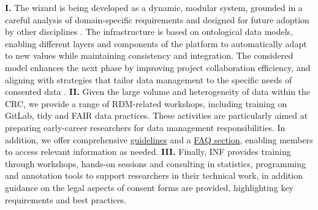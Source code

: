 \documentclass{eceasst}
\begin{document}
\textbf{I.} The wizard is being developed as a dynamic, modular system, grounded in a careful analysis of domain-specific requirements and designed for future adoption by other disciplines \cite{StrathmannJoppek2026}.
The infrastructure is based on ontological data models, enabling different layers and components of the platform to automatically adapt to new values while maintaining consistency and integration.
The considered model enhances the next phase by improving project collaboration efficiency, and aligning with strategies that tailor data management to the specific needs of consented data \cite{Mohammadietal2026}. %
\textbf{II.} Given the large volume and heterogeneity of data within the CRC, we provide a range of RDM-related workshops, including training on GitLab, tidy and FAIR data practices. These activities are particularly aimed at preparing early-career researchers for data management responsibilities. In addition, we offer comprehensive \href{https://purl.org/crc1646/INF/guidelines}{guidelines} and a \href{https://purl.org/crc1646/INF/FAQ}{FAQ section}, enabling members to access relevant information as needed. 
\textbf{III.} Finally, INF provides training through workshops, hands-on sessions and consulting in statistics, programming and annotation tools to support researchers in their technical work, in addition guidance on the legal aspects of consent forms are provided, highlighting key requirements and best practices.
\end{document}
